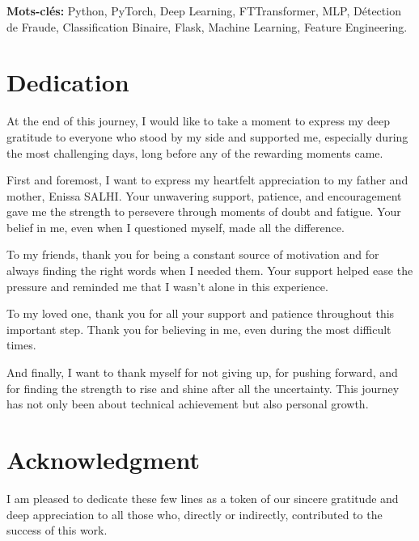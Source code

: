 \documentclass[12pt,a4paper,twoside]{report}
\begin{document}
\vspace{1cm}

\noindent \textbf{Mots-clés:} Python, PyTorch, Deep Learning, FTTransformer, MLP, Détection de Fraude, Classification Binaire, Flask, Machine Learning, Feature Engineering.

\chapter*{Dedication}

At the end of this journey, I would like to take a moment to express my deep gratitude to everyone who stood by my side and supported me, especially during the most challenging days, long before any of the rewarding moments came.

First and foremost, I want to express my heartfelt appreciation to my father and mother, Enissa SALHI. Your unwavering support, patience, and encouragement gave me the strength to persevere through moments of doubt and fatigue. Your belief in me, even when I questioned myself, made all the difference.

To my friends, thank you for being a constant source of motivation and for always finding the right words when I needed them. Your support helped ease the pressure and reminded me that I wasn't alone in this experience.

To my loved one, thank you for all your support and patience throughout this important step. Thank you for believing in me, even during the most difficult times.

And finally, I want to thank myself for not giving up, for pushing forward, and for finding the strength to rise and shine after all the uncertainty. This journey has not only been about technical achievement but also personal growth.

\chapter*{Acknowledgment}

I am pleased to dedicate these few lines as a token of our sincere gratitude and deep appreciation to all those who, directly or indirectly, contributed to the success of this work.
\end{document}
